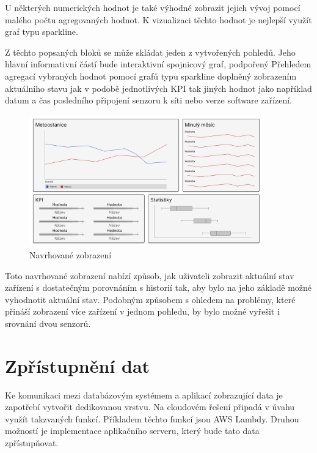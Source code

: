 U některých numerických hodnot je také výhodné zobrazit jejich vývoj pomocí malého počtu agregovaných hodnot. K vizualizaci těchto hodnot je nejlepší využít graf typu sparkline.

Z těchto popsaných bloků se může skládat jeden z vytvořených pohledů. Jeho hlavní informativní částí bude interaktivní spojnicový graf, podpořený Přehledem agregací vybraných hodnot pomocí grafů typu sparkline doplněný zobrazením aktuálního stavu jak v podobě jednotlivých KPI tak jiných hodnot jako například datum a čas posledního připojení senzoru k síti nebo verze software zařízení.

\begin{figure}[H]
\label{question4}
\begin{center}
    \includegraphics[width=0.9\textwidth]{obrazky-figures/view1.pdf}
\end{center}
\caption{Navrhované zobrazení}
\end{figure}

Toto navrhované zobrazení nabízí způsob, jak uživateli zobrazit aktuální stav zařízení s dostatečným porovnáním s historií tak, aby bylo na jeho základě možné vyhodnotit aktuální stav. Podobným způsobem s ohledem na problémy, které přináší zobrazení více zařízení v jednom pohledu, by bylo možné vyřešit i srovnání dvou senzorů.

\section{Zpřístupnění dat}

Ke komunikaci mezi databázovým systémem a aplikací zobrazující data je zapotřebí vytvořit dedikovanou vrstvu. Na cloudovém řešení připadá v úvahu využít takzvaných  funkcí. Příkladem těchto funkcí jsou AWS Lambdy. Druhou možností je implementace aplikačního serveru, který bude tato data zpřístupňovat. 


